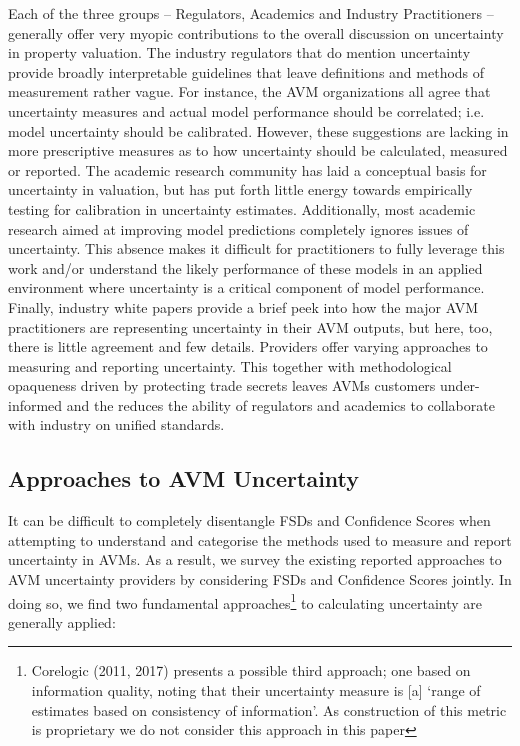 \documentclass[colTwo]{anon}
\theoremstyle{definition}
\begin{document}
Each of the three groups -- Regulators, Academics and Industry Practitioners -- generally offer very myopic contributions to the overall discussion on uncertainty in property valuation. The industry regulators that do mention uncertainty provide broadly interpretable guidelines that leave definitions and methods of measurement rather vague.  For instance, the AVM organizations all agree that uncertainty measures and actual model performance should be correlated; i.e. model uncertainty should be calibrated.  However, these suggestions are lacking in more prescriptive measures as to how uncertainty should be calculated, measured or reported.  The academic research community has laid a conceptual basis for uncertainty in valuation, but has put forth little energy towards empirically testing for calibration in uncertainty estimates. Additionally, most academic research aimed at improving model predictions completely ignores issues of uncertainty.  This absence makes it difficult for practitioners to fully leverage this work and/or understand the likely performance of these models in an applied environment where uncertainty is a critical component of model performance.  Finally, industry white papers provide a brief peek into how the major AVM practitioners are representing uncertainty in their AVM outputs, but here, too, there is little agreement and few details. Providers offer varying approaches to measuring and reporting uncertainty. This together with methodological opaqueness driven by protecting trade secrets leaves AVMs customers under-informed and the reduces the ability of regulators and academics to collaborate with industry on unified standards.

\subsection{Approaches to AVM Uncertainty}

It can be difficult to completely disentangle FSDs and Confidence Scores when attempting to understand and categorise the methods used to measure and report uncertainty in AVMs.  As a result, we survey the existing reported approaches to AVM uncertainty providers by considering FSDs and Confidence Scores jointly.  In doing so, we find two fundamental approaches\footnote{Corelogic (2011, 2017) presents a possible third approach; one based on information quality, noting that their uncertainty measure is [a] ‘range of estimates based on consistency of information’. As construction of this metric is proprietary we do not consider this approach in this paper} to calculating uncertainty are generally applied: 
\end{document}
